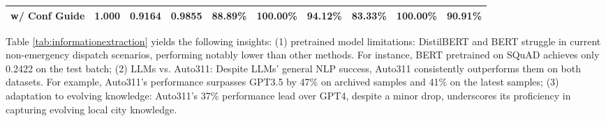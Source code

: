 \begin{table}[t]
\begin{tabular}{||c|ccccccccc||}
w/ Conf Guide     & \multicolumn{1}{c|}{\textbf{1.000}}                                                                   & \multicolumn{1}{c|}{\textbf{0.9164}}                                                                       & \multicolumn{1}{c|}{\textbf{0.9855}}                                                                   & \multicolumn{1}{c|}{\textbf{88.89\%}} & \multicolumn{1}{c|}{\textbf{100.00\%}} & \multicolumn{1}{c|}{\textbf{94.12\%}} & \multicolumn{1}{c|}{\textbf{83.33\%}} & \multicolumn{1}{c|}{\textbf{100.00\%}} & \textbf{90.91\%} \\ \hline
\end{tabular}
\label{tab:confidence_on_different_question_types}
\end{table}



Table \ref{tab:informationextraction} yields the following insights: (1) pretrained model limitations: DistilBERT and BERT struggle in current non-emergency dispatch scenarios, performing notably lower than other methods. For instance, BERT pretrained on SQuAD achieves only 0.2422 on the test batch; (2) LLMs vs. Auto311: Despite LLMs' general NLP success, Auto311 consistently outperforms them on both datasets. For example, Auto311's performance surpasses GPT3.5 by 47\% on archived samples and 41\% on the latest samples; (3) adaptation to evolving knowledge: Auto311's 37\% performance lead over GPT4, despite a minor drop, underscores its proficiency in capturing evolving local city knowledge.

